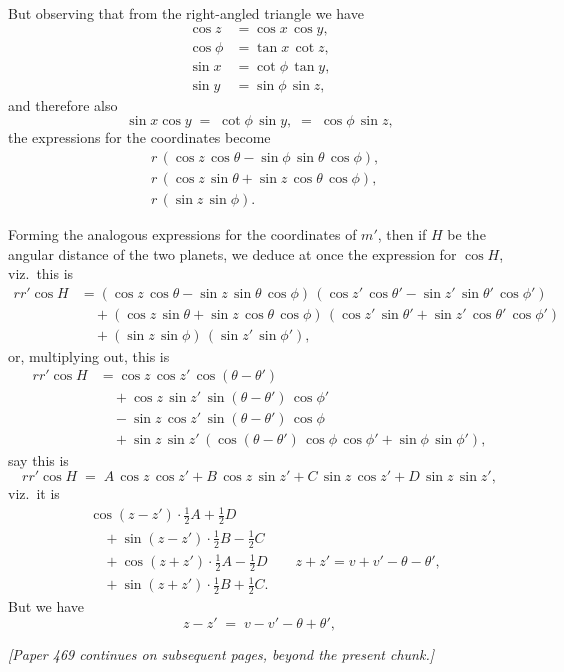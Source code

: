 \documentclass[11pt]{article}
\begin{document}
But observing that from the right-angled triangle we have
\begin{align*}
\cos z &= \cos x\,\cos y, \\
\cos \phi &= \tan x\,\cot z, \\
\sin x &= \cot \phi\,\tan y, \\
\sin y &= \sin \phi\,\sin z,
\end{align*}
and therefore also
\[
\sin x \cos y \;=\; \cot \phi\,\sin y, \;=\; \cos \phi\,\sin z,
\]
the expressions for the coordinates become
\begin{align*}
&r\,(\cos z\,\cos \theta - \sin \phi\,\sin \theta\,\cos \phi), \\
&r\,(\cos z\,\sin \theta + \sin z\,\cos \theta\,\cos \phi), \\
&r\,(\sin z\,\sin \phi).
\end{align*}

Forming the analogous expressions for the coordinates of $m'$, then if
$H$ be the angular distance of the two planets, we deduce at once the
expression for $\cos H$, viz.\ this is
\begin{align*}
r r'\cos H &= (\cos z\,\cos \theta - \sin z\,\sin \theta\,\cos \phi)\,(\cos z'\,\cos \theta' - \sin z'\,\sin \theta'\,\cos \phi') \\
&\quad + (\cos z\,\sin \theta + \sin z\,\cos \theta\,\cos \phi)\,(\cos z'\,\sin \theta' + \sin z'\,\cos \theta'\,\cos \phi') \\
&\quad + (\sin z\,\sin \phi)\,(\sin z'\,\sin \phi'),
\end{align*}
or, multiplying out, this is
\begin{align*}
r r'\cos H &= \cos z\,\cos z'\,\cos(\theta - \theta') \\
&\quad + \cos z\,\sin z'\,\sin(\theta - \theta')\,\cos \phi' \\
&\quad - \sin z\,\cos z'\,\sin(\theta - \theta')\,\cos \phi \\
&\quad + \sin z\,\sin z'\,(\cos(\theta - \theta')\,\cos \phi\,\cos \phi' + \sin \phi\,\sin \phi'),
\end{align*}
say this is
\[
r r'\cos H \;=\; A\,\cos z\,\cos z' + B\,\cos z\,\sin z' + C\,\sin z\,\cos z' + D\,\sin z\,\sin z',
\]
viz.\ it is
\begin{align*}
&\cos(z - z')\cdot \tfrac{1}{2}A + \tfrac{1}{2}D \\
&\quad + \sin(z - z')\cdot \tfrac{1}{2}B - \tfrac{1}{2}C \\
&\quad + \cos(z + z')\cdot \tfrac{1}{2}A - \tfrac{1}{2}D \qquad z + z' = v + v' - \theta - \theta', \\
&\quad + \sin(z + z')\cdot \tfrac{1}{2}B + \tfrac{1}{2}C.
\end{align*}
But we have
\[
z - z' \;=\; v - v' - \theta + \theta',
\]

\textit{[Paper 469 continues on subsequent pages, beyond the present
chunk.]}
\end{document}
